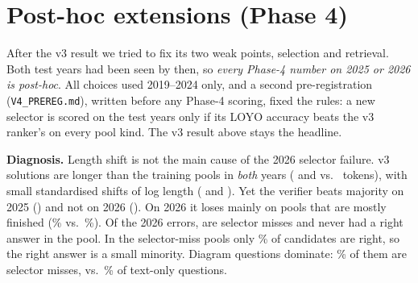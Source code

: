 \documentclass[conference]{IEEEtran}
\begin{document}
\section{Post-hoc extensions (Phase 4)}\label{sec:v4}
After the v3 result we tried to fix its two weak points, selection and retrieval. Both test years
had been seen by then, so \emph{every Phase-4 number on 2025 or 2026 is post-hoc}. All choices
used 2019--2024 only, and a second pre-registration (\texttt{V4\_PREREG.md}), written before any
Phase-4 scoring, fixed the rules: a new selector is scored on the test years only if its LOYO
accuracy beats the v3 ranker's on every pool kind. The v3 result above stays the headline.

\textbf{Diagnosis.} Length shift is not the main cause of the 2026 selector failure. v3 solutions
are longer than the training pools in \emph{both} years (\VfTokTwentyFive{} and \VfTokTwentySix{}
vs.\ \VfTokTrain{} tokens), with small standardised shifts of log length (\VfSmdTwentyFive{} and
\VfSmdTwentySix). Yet the verifier beats majority on 2025 (\VfVerMajTwentyFive) and not on 2026
(\VfVerMajTwentySix). On 2026 it loses mainly on pools that are mostly finished (\VfFinVer\% vs.\
\VfFinMaj\%). Of the 2026 errors, \VfErrMiss{} are selector misses and \VfErrNever{} never had a
right answer in the pool. In the selector-miss pools only \VfErrShare\% of candidates are right,
so the right answer is a small minority. Diagram questions dominate: \VfImgMiss\% of them are
selector misses, vs.\ \VfTxtMiss\% of text-only questions.


\end{document}
